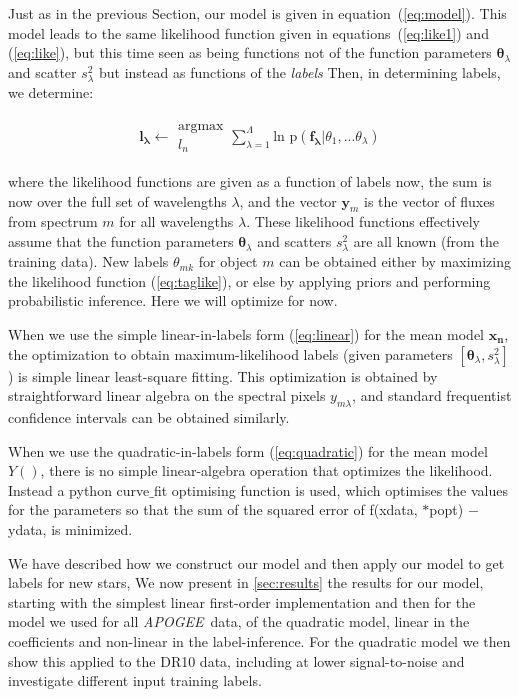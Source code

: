 \documentclass[12pt, preprint]{aastex}
\newcommand{\sectionname}{Section}
\newcommand{\set}[1]{\bm{#1}}
\newcommand{\apogee}{\textsl{APOGEE}}
\begin{document}
Just as in the previous \sectionname, our model is given in
equation~(\ref{eq:model}).
This model leads to the same likelihood function given in
equations~(\ref{eq:like1}) and (\ref{eq:like}), but this time seen as
being functions not of the function parameters $\set{\theta}_\lambda$ and
scatter $s_\lambda^2$ but instead as functions of the \emph{labels}
Then, in determining labels, we determine: 

\begin{eqnarray}
\set{l_\lambda} \leftarrow \substack{\mbox{argmax}\\
{l_n}  }
\sum_{\lambda=1}^\Lambda \mbox{ln p}(\set{f_\lambda} | {\theta_1,...\theta_\lambda})
\end{eqnarray}

where the likelihood functions are given as a function of labels now,
the sum is now over the full set of wavelengths
$\lambda$, and the vector $\set{y}_m$ is the vector of fluxes from
spectrum $m$ for all wavelengths $\lambda$.
These likelihood functions effectively assume that the function
parameters $\set{\theta}_\lambda$ and scatters $s_\lambda^2$ are all known (from
the training data).
New labels $\theta_{mk}$ for object $m$ can be obtained either by maximizing
the likelihood function (\ref{eq:taglike}), or else by applying priors
and performing probabilistic inference.
Here we will optimize for now.

When we use the simple linear-in-labels form (\ref{eq:linear}) for the
mean model $\set{x_n}$, the optimization to obtain maximum-likelihood labels
(given parameters $[\set{\theta}_\lambda, s_\lambda^2]$) is simple linear
least-square fitting.
This optimization is obtained by straightforward linear algebra on the
spectral pixels $y_{m\lambda}$, and standard frequentist confidence
intervals can be obtained similarly.

When we use the quadratic-in-labels form (\ref{eq:quadratic}) for the
mean model $Y()$, there is no simple linear-algebra operation that
optimizes the likelihood. Instead a python curve$\_$fit optimising function is used, which optimises the values for the parameters so that the sum of the squared error of f(xdata, $*$popt) $-$ ydata,  is minimized. 

We have described how we construct our model and then apply our model to get labels for new stars, We now present in \ref{sec:results} the results for our model, starting with the simplest linear first-order implementation and then for the model we used for all \apogee\ data, of the quadratic model, linear in the coefficients and non-linear in the label-inference.  For the quadratic model we then show this applied to the DR10 data, including at lower signal-to-noise and investigate different input training labels. 
\end{document}
